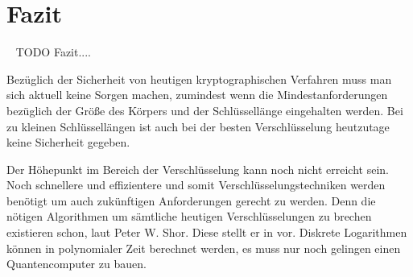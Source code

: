 \section*{Fazit}~\label{Kapitel Fazit}
	TODO Fazit....
	
	\wup Bezüglich der Sicherheit von heutigen kryptographischen Verfahren muss man sich aktuell keine Sorgen machen, zumindest wenn die Mindestanforderungen bezüglich der Größe des Körpers und der Schlüssellänge eingehalten werden. Bei zu kleinen Schlüssellängen ist auch bei der besten Verschlüsselung heutzutage keine Sicherheit gegeben.
	
	\wupp Der Höhepunkt im Bereich der Verschlüsselung kann noch nicht erreicht sein. Noch schnellere und effizientere und somit  Verschlüsselungstechniken werden benötigt um auch zukünftigen Anforderungen gerecht zu werden. Denn die nötigen Algorithmen um sämtliche heutigen Verschlüsselungen zu brechen existieren schon, laut Peter W. Shor. Diese stellt er in \cite{Algorithms:for:Quantum:Computation:Discrete:Logarithms:and:Factoring} vor. Diskrete Logarithmen können in polynomialer Zeit berechnet werden, es muss nur noch gelingen einen Quantencomputer zu bauen.